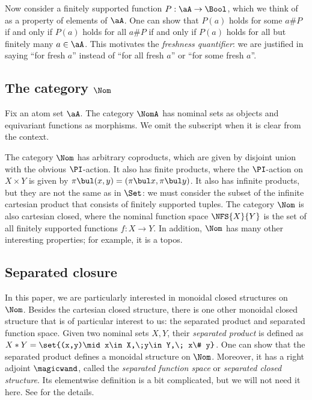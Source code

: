 \documentclass[twoside,11pt]{entics}
\begin{document}
Now consider a finitely supported function $P:\aA\to \Bool$, which we
think of as a property of elements of $\aA$. One can show that $P(a)$
holds for some $a\# P$ if and only if $P(a)$ holds for all $a\# P$ if
and only if $P(a)$ holds for all but finitely many $a\in\aA$. This
motivates the \emph{freshness quantifier}: we are justified in saying
``for fresh $a$'' instead of ``for all fresh $a$'' or ``for some
fresh $a$''.

\subsection{The category $\Nom$}

Fix an atom set $\aA$. The category $\NomA$ has nominal sets as objects
and equivariant functions as morphisms. We omit the subscript when
it is clear from the context.

The category $\Nom$ has arbitrary coproducts, which are given by
disjoint union with the obvious $\PI$-action. It also has finite
products, where the $\PI$-action on $X\times Y$ is given by
$\pi\bul(x,y) = (\pi\bul x, \pi\bul y)$. It also has infinite
products, but they are not the same as in $\Set$: we must consider the
subset of the infinite cartesian product that consists of finitely
supported tuples. The category $\Nom$ is also cartesian closed, where
the nominal function space $\NFS{X}{Y}$ is the set of all finitely
supported functions $f:X\to Y$. In addition, $\Nom$ has many other
interesting properties; for example, it is a topos.

\subsection{Separated closure}

In this paper, we are particularly interested in monoidal closed
structures on $\Nom$. Besides the cartesian closed structure, there is
one other monoidal closed structure that is of particular interest to
us: the separated product and separated function space. Given two
nominal sets $X,Y$, their \emph{separated product} is defined as
$X\ast Y = \set{(x,y)\mid x\in X,\;y\in Y,\; x\# y}$. One can show
that the separated product defines a monoidal structure on
$\Nom$. Moreover, it has a right adjoint $\magicwand$, called the
\emph{separated function space} or \emph{separated closed structure}.
Its elementwise definition is a bit complicated, but we will not need
it here. See {\cite[Def.~3.2]{Clouston2013}} for the details.
\end{document}

